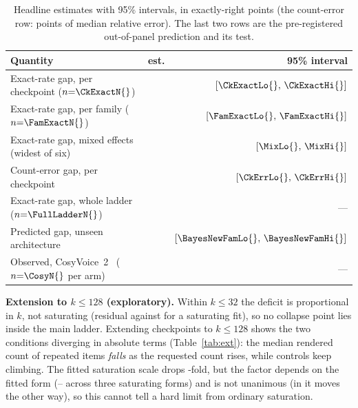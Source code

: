\documentclass{article}
\newcommand{\tabsize}{\small}
\begin{document}
\begin{table}[t]
\centering
\caption{Headline estimates with 95\% intervals, in exactly-right points
(the count-error row: points of median relative error). The last two rows
are the pre-registered out-of-panel prediction and its test.}
\label{tab:ci}
{\tabsize\setlength{\tabcolsep}{3.5pt}
\begin{tabular}{lrr}
\toprule
Quantity & est. & 95\% interval \\
\midrule
Exact-rate gap, per checkpoint ($n{=}\CkExactN{}$) & \CkExact{} & $[\CkExactLo{},\,\CkExactHi{}]$ \\
Exact-rate gap, per family ($n{=}\FamExactN{}$)    & \FamExact{} & $[\FamExactLo{},\,\FamExactHi{}]$ \\
Exact-rate gap, mixed effects (widest of six)      & \MixArm{}  & $[\MixLo{},\,\MixHi{}]$ \\
Count-error gap, per checkpoint                    & \CkErr{}   & $[\CkErrLo{},\,\CkErrHi{}]$ \\
Exact-rate gap, whole ladder ($n{=}\FullLadderN{}$) & \FullLadderGap{} & --- \\
\midrule
Predicted gap, unseen architecture                 & \BayesNewFam{} & $[\BayesNewFamLo{},\,\BayesNewFamHi{}]$ \\
Observed, CosyVoice~2~\cite{du2024cosyvoice2} ($n{=}\CosyN{}$ per arm) & \CosyGap{} & --- \\
\bottomrule
\end{tabular}}
\end{table}

\begin{table}[t]
\centering
\caption{Every system tested, $k\ge6$, CTC judge: median $(\hat c-k)/k$
and exactly-right rate, repeated (rep.) against control (ctl.). Systems in
the lower block are outside the panel; their count errors are in the
supplementary material.}
\label{tab:models}
{\tabsize\setlength{\tabcolsep}{2.5pt}}
\end{table}

\textbf{Extension to $k\le128$ (exploratory).}
Within $k\le32$ the deficit is proportional in $k$, not saturating
(residual \ShapePropSSE{} against \ShapeSatSSE{} for a saturating fit), so
no collapse point lies inside the main ladder. Extending \HzNModels{}
checkpoints to $k\le128$ shows the two conditions diverging in absolute terms
(Table~\ref{tab:ext}): the median rendered count of repeated items
\emph{falls} as the requested count rises, while controls keep climbing.
The fitted saturation scale drops \HzRatio{}-fold, but the factor
depends on the fitted form (\HzFormLo{}--\HzFormHi{} across three
saturating forms) and is not unanimous (in \HzRevNames{} it moves the
other way), so this cannot tell a hard limit from ordinary saturation.
\end{document}
